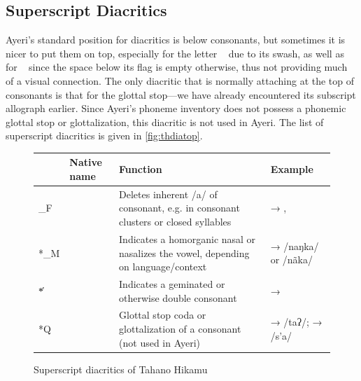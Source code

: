 \subsection{Superscript Diacritics}

Ayeri's standard position for diacritics is below consonants, but sometimes it 
is nicer to put them on top, especially for the letter ~ due to 
its swash, as well as for ~ since the space below its flag is 
empty otherwise, thus not providing much of a visual connection. The only 
diacritic that is normally attaching at the top of consonants is that for the 
glottal stop---we have already encountered its subscript allograph earlier. 
Since Ayeri's phoneme inventory does not possess a phonemic glottal stop or 
glottalization, this diacritic is not used in Ayeri. The list of superscript 
diacritics is given in \autoref{fig:thdiatop}.

\begin{figure}[htp]
\caption{Superscript diacritics of Tahano Hikamu}
\begin{tabu} to 
\toprule
\tableheaderfont

	& Native name
	& Function
	& Example
	\\
	
\toprule

*\_F
	& 
	& Deletes inherent /a/ of consonant, e.g. in consonant clusters or 
		closed syllables
	&  → , 
	\\
	
\midrule

*\_M
	& 
	& Indicates a homorganic nasal or nasalizes the vowel, depending on 
		language/context
	&  →  /naŋka/ or /nãka/
	\\
	
\midrule

*̔
	& 
	& Indicates a geminated or otherwise double consonant
	&  → 
	\\
	
\midrule

*Q
	& 
	& Glottal stop coda or glottalization of a consonant (not used in Ayeri)
	&  →  /taʔ/;\newline
		 →  /s’a/
	\\

\bottomrule
\end{tabu}
\label{fig:thdiatop}
\end{figure}

